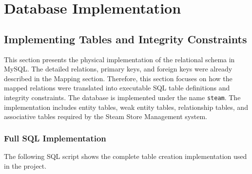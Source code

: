 \newpage
\section{Database Implementation}
\subsection{Implementing Tables and Integrity Constraints}
This section presents the physical implementation of the relational schema in MySQL. 
The detailed relations, primary keys, and foreign keys were already described in the Mapping section. 
Therefore, this section focuses on how the mapped relations were translated into executable SQL table definitions and integrity constraints.
The database is implemented under the name \texttt{steam}. 
The implementation includes entity tables, weak entity tables, relationship tables, and associative tables required by the Steam Store Management system.


\subsubsection{Full SQL Implementation}

The following SQL script shows the complete table creation implementation used in the project.


